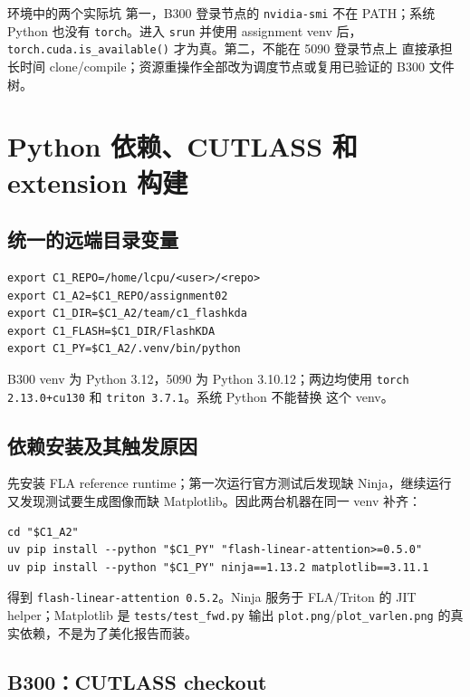 \documentclass[11pt,a4paper,fontset=none]{ctexart}
\newcommand{\code}[1]{\texttt{#1}}
\begin{document}
\begin{record}{环境中的两个实际坑}
第一，B300 登录节点的 \code{nvidia-smi} 不在 PATH；系统 Python 也没有
\code{torch}。进入 \code{srun} 并使用 assignment venv 后，
\code{torch.cuda.is\_available()} 才为真。第二，不能在 5090 登录节点上
直接承担长时间 clone/compile；资源重操作全部改为调度节点或复用已验证的
B300 文件树。
\end{record}

\section{Python 依赖、CUTLASS 和 extension 构建}

\subsection{统一的远端目录变量}

\begin{lstlisting}
export C1_REPO=/home/lcpu/<user>/<repo>
export C1_A2=$C1_REPO/assignment02
export C1_DIR=$C1_A2/team/c1_flashkda
export C1_FLASH=$C1_DIR/FlashKDA
export C1_PY=$C1_A2/.venv/bin/python
\end{lstlisting}

B300 venv 为 Python 3.12，5090 为 Python 3.10.12；两边均使用
\code{torch 2.13.0+cu130} 和 \code{triton 3.7.1}。系统 Python 不能替换
这个 venv。

\subsection{依赖安装及其触发原因}

先安装 FLA reference runtime；第一次运行官方测试后发现缺 Ninja，继续运行
又发现测试要生成图像而缺 Matplotlib。因此两台机器在同一 venv 补齐：

\begin{lstlisting}
cd "$C1_A2"
uv pip install --python "$C1_PY" "flash-linear-attention>=0.5.0"
uv pip install --python "$C1_PY" ninja==1.13.2 matplotlib==3.11.1
\end{lstlisting}

得到 \code{flash-linear-attention 0.5.2}。Ninja 服务于 FLA/Triton 的
JIT helper；Matplotlib 是 \code{tests/test\_fwd.py} 输出
\code{plot.png}/\code{plot\_varlen.png} 的真实依赖，不是为了美化报告而装。

\subsection{B300：CUTLASS checkout}
\end{document}
